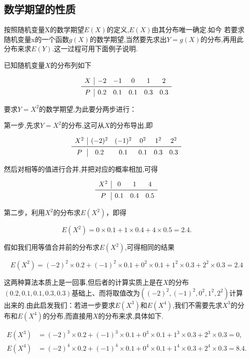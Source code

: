 \subsection{数学期望的性质}

按照随机变量X的数学期望$ E(X) $的定义,$ E(X) $由其分布唯一确定.如今
若要求随机变量x的一个函数$ g(X) $的数学期望,当然要先求出$ Y=g(X) $的分布,再用此分布来求$ E(Y )$.这一过程可用下面例子说明.

\begin{example}
	已知随机变量$ X $的分布列如下
	
	\[
	\begin{array}{c|ccccc}
	X &{-2} & {-1} & {0} & {1} & {2} \\ \midrule
	P & {0.2} & {0.1} & {0.1} & {0.3} & {0.3}
	\end{array}
	\]
	
	要求$ Y=X^2 $的数学期望,为此要分两步进行：
	
	第一步,先求$ Y=X^2 $的分布,这可从$ X $的分布导出,即
	
	\[
	\begin{array}{c|ccccc}
	X^2    & (-2)^2 & (-1)^2 & 0^2    & 1^2    & 2^2 \\\midrule
	P     & 0.2   & 0.1   & 0.1   & 0.3   & 0.3 \\
	\end{array}
	\]
	
	然后对相等的值进行合并,并把对应的概率相加,可得
	
	\[
	\begin{array}{c|ccc}
	X^2    & 0     & 1     & 4 \\\midrule
	P     & 0.1   & 0.4   & 0.5 \\
	\end{array}
	\]
	
	第二步，利用$ X^2 $的分布求$ E(X^2) $，即得
	
	\[
	  E(X^{2})=0 \times 0.1+1 \times 0.4+4 \times 0.5=2.4.
	\]
	
	假如我们用等值合并前的分布求$ E(X^2) $,可得相同的结果
	
	\[
	  E(X^{2})=(-2)^{2} \times 0.2+(-1)^{2} \times 0.1+0^{2} \times 0.1+1^{2} \times 0.3+2^{2} \times 0.3=2.4
	\]
	
	这两种算法本质上是一回事,但后者的计算实质上是在$ X $的分布$ (0.2,
	0.1,0.1,0.3,0.3) $基础上、而将取值改为$\left((-2)^{2},(-1)^{2}, 0^{2}, 1^{2}, 2^{2}\right)$计算出来的.由此启发我们：若进一步要求$ E(X^3) $和$ E(X^4) $,我们不需要先求$ X^3 $的分布和$ E\left(X^{4}\right) $的分布,而直接用$ X $的分布来求,具体如下.
	
	\[
	\begin{aligned}
	 E (X^{3} ) &=(-2)^{3} \times 0.2+(-1)^{3} \times 0.1+0^{3} \times 0.1+1^{3} \times 0.3+2^{3} \times 0.3=0, \\
    E(X^{4}) &=(-2)^{4} \times 0.2+(-1)^{4} \times 0.1+0^{4} \times 0.1+1^{4} \times 0.3+2^{4} \times 0.3=8.4.
	\end{aligned}
	\]
	
\end{example}



